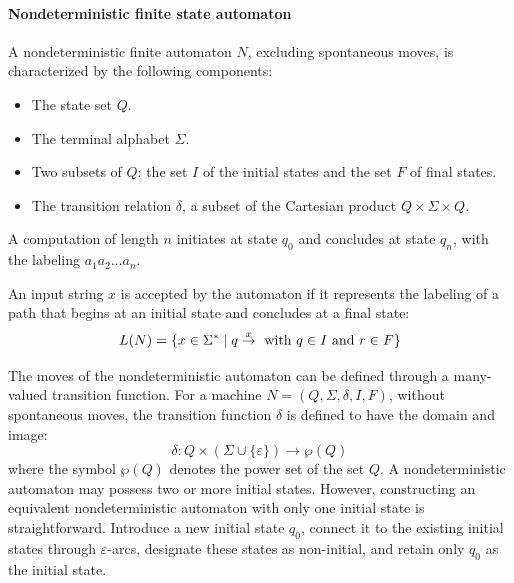 \paragraph*{Nondeterministic finite state automaton}
A nondeterministic finite automaton $N$, excluding spontaneous moves, is characterized by the following components:
\begin{itemize}
    \item The state set $Q$. 
    \item The terminal alphabet $\Sigma$. 
    \item Two subsets of $Q$: the set $I$ of the initial states and the set $F$ of final states.
    \item The transition relation $\delta$, a subset of the Cartesian product $Q\times\Sigma\times Q$.     
\end{itemize}
A computation of length $n$ initiates at state $q_0$ and concludes at state $q_n$, with the labeling $a_1a_2\dots a_n$. 
\begin{definition}
    An input string $x$ is accepted by the automaton if it represents the labeling of a path that begins at an initial state and concludes at a final state:
    \[L(N)=\{x \in \Sigma^{\ast}\mid q \overset{x}{\rightarrow} \textnormal{ with } q \in I \textnormal{ and } r \in F\}\]
\end{definition}
The moves of the nondeterministic automaton can be defined through a many-valued transition function.  
For a machine $N=(Q,\Sigma,\delta,I,F)$, without spontaneous moves, the transition function $\delta$ is defined to have the domain and image:
\[\delta:Q\times\left(\Sigma\cup\{\varepsilon\}\right)\rightarrow \wp(Q)\]
where the symbol $\wp(Q)$ denotes the power set of the set $Q$.
A nondeterministic automaton may possess two or more initial states.
However, constructing an equivalent nondeterministic automaton with only one initial state is straightforward.
Introduce a new initial state $q_0$, connect it to the existing initial states through $\varepsilon$-arcs, designate these states as non-initial, and retain only $q_0$ as the initial state.

